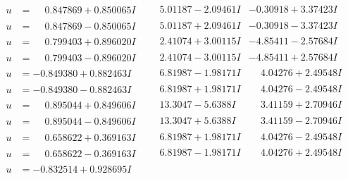 \documentclass[1p]{elsarticle_modified}
\theoremstyle{definition}
\begin{document}
$$\begin{array}{c|c|c}
\begin{aligned}
u &= \phantom{-}0.847869 + 0.850065 I\end{aligned}
 & \phantom{-}5.01187 - 2.09461 I & -0.30918 + 3.37423 I \\ \hline\begin{aligned}
u &= \phantom{-}0.847869 - 0.850065 I\end{aligned}
 & \phantom{-}5.01187 + 2.09461 I & -0.30918 - 3.37423 I \\ \hline\begin{aligned}
u &= \phantom{-}0.799403 + 0.896020 I\end{aligned}
 & \phantom{-}2.41074 + 3.00115 I & -4.85411 - 2.57684 I \\ \hline\begin{aligned}
u &= \phantom{-}0.799403 - 0.896020 I\end{aligned}
 & \phantom{-}2.41074 - 3.00115 I & -4.85411 + 2.57684 I \\ \hline\begin{aligned}
u &= -0.849380 + 0.882463 I\end{aligned}
 & \phantom{-}6.81987 - 1.98171 I & \phantom{-}4.04276 + 2.49548 I \\ \hline\begin{aligned}
u &= -0.849380 - 0.882463 I\end{aligned}
 & \phantom{-}6.81987 + 1.98171 I & \phantom{-}4.04276 - 2.49548 I \\ \hline\begin{aligned}
u &= \phantom{-}0.895044 + 0.849606 I\end{aligned}
 & \phantom{-}13.3047 - 5.6388 I & \phantom{-}3.41159 + 2.70946 I \\ \hline\begin{aligned}
u &= \phantom{-}0.895044 - 0.849606 I\end{aligned}
 & \phantom{-}13.3047 + 5.6388 I & \phantom{-}3.41159 - 2.70946 I \\ \hline\begin{aligned}
u &= \phantom{-}0.658622 + 0.369163 I\end{aligned}
 & \phantom{-}6.81987 + 1.98171 I & \phantom{-}4.04276 - 2.49548 I \\ \hline\begin{aligned}
u &= \phantom{-}0.658622 - 0.369163 I\end{aligned}
 & \phantom{-}6.81987 - 1.98171 I & \phantom{-}4.04276 + 2.49548 I \\ \hline\begin{aligned}
u &= -0.832514 + 0.928695 I\end{aligned}

\end{array}$$
\end{document}
